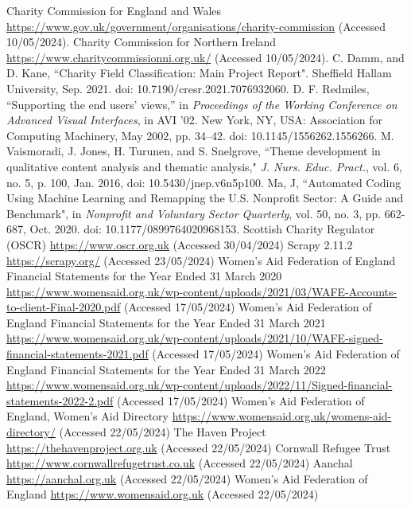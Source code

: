\documentclass[conference]{IEEEtran}
\begin{document}
\begin{thebibliography}{00}
 Charity Commission for England and Wales \url{https://www.gov.uk/government/organisations/charity-commission} (Accessed 10/05/2024).
 Charity Commission for Northern Ireland \url{https://www.charitycommissionni.org.uk/} (Accessed 10/05/2024).
 C. Damm, and D. Kane, ``Charity Field Classification: Main Project Report". Sheffield Hallam University, Sep. 2021. doi: 10.7190/cresr.2021.7076932060.
 D. F. Redmiles, “Supporting the end users’ views,” in \textit{Proceedings of the Working Conference on Advanced Visual Interfaces}, in AVI ’02. New York, NY, USA: Association for Computing Machinery, May 2002, pp. 34–42. doi: 10.1145/1556262.1556266.
 M. Vaismoradi, J. Jones, H. Turunen, and S. Snelgrove, ``Theme development in qualitative content analysis and thematic analysis," \textit{J. Nurs. Educ. Pract.}, vol. 6, no. 5, p. 100, Jan. 2016, doi: 10.5430/jnep.v6n5p100.
 Ma, J, ``Automated Coding Using Machine Learning and Remapping the U.S. Nonprofit Sector: A Guide and Benchmark", in \textit{Nonprofit and Voluntary Sector Quarterly}, vol. 50, no. 3, pp. 662-687, Oct. 2020. doi: 10.1177/0899764020968153.
 Scottish Charity Regulator (OSCR) \url{https://www.oscr.org.uk} (Accessed 30/04/2024)
 Scrapy 2.11.2
\url{https://scrapy.org/} (Accessed 23/05/2024)
 Women's Aid Federation of England Financial Statements for the Year Ended 31 March 2020 \url{https://www.womensaid.org.uk/wp-content/uploads/2021/03/WAFE-Accounts-to-client-Final-2020.pdf} (Accessed 17/05/2024)
 Women's Aid Federation of England Financial Statements for the Year Ended 31 March 2021 \url{https://www.womensaid.org.uk/wp-content/uploads/2021/10/WAFE-signed-financial-statements-2021.pdf} (Accessed 17/05/2024)
 Women's Aid Federation of England Financial Statements for the Year Ended 31 March 2022 \url{https://www.womensaid.org.uk/wp-content/uploads/2022/11/Signed-financial-statements-2022-2.pdf} (Accessed 17/05/2024)
 Women's Aid Federation of England, Women's Aid Directory \url{https://www.womensaid.org.uk/womens-aid-directory/} (Accessed 22/05/2024)
 The Haven Project \url{https://thehavenproject.org.uk} (Accessed 22/05/2024)
 Cornwall Refugee Trust \url{https://www.cornwallrefugetrust.co.uk} (Accessed 22/05/2024)
 Aanchal
\url{https://aanchal.org.uk} (Accessed 22/05/2024)
 Women’s Aid Federation of England \url{https://www.womensaid.org.uk} (Accessed 22/05/2024)
\end{thebibliography}
\end{document}
